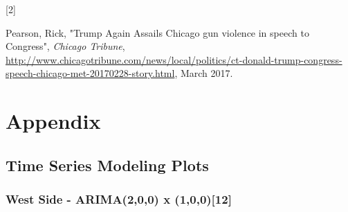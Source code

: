 \documentclass{article} %
\begin{document}
\hypertarget{Ref2}{[2]} Pearson, Rick, "Trump Again Assails Chicago gun violence in speech to Congress", \textit{Chicago Tribune}, \url{http://www.chicagotribune.com/news/local/politics/ct-donald-trump-congress-speech-chicago-met-20170228-story.html}, March 2017.


\clearpage
\newpage

\section{Appendix}
\label{appendix}


\subsection{Time Series Modeling Plots}
\label{appendix_regression}

 
\subsubsection{West Side - ARIMA(2,0,0) x (1,0,0)[12]}
 

 
 
\end{document}

